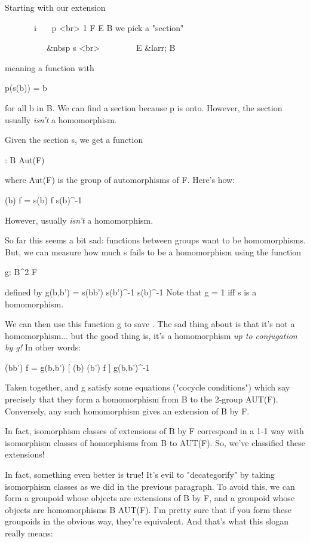 Starting with our extension

\  \  \  \  \  \  \  
 i    
\  \  \  
 p  <br>
1 \to  F \to  E \to  B 
we pick a "section"

\  \  \  \  \  \  \  
\  \  \  &nbsp
                s  <br>
\  \  \  \  \  \  \  \  
            E &larr; B

meaning a function with 

p(s(b)) = b

for all b in B.  We can find a section because p is onto.  However,
the section usually \emph{isn't} a homomorphism.

Given the section s, we get a function 

\alpha : B \to  Aut(F)

where Aut(F) is the group of automorphisms of F.  Here's how:

\alpha (b) f = s(b) f s(b)^{-1}

However, usually \alpha  \emph{isn't} a homomorphism.  

So far this seems a bit sad: functions between groups want
to be homomorphisms.
But, we can measure how much s fails to be a homomorphism 
using the function

g: B^{2} \to  F

defined by
g(b,b') = s(bb') s(b')^{-1} s(b)^{-1}
Note that g = 1 iff s is a homomorphism.  

We can then use this
function g to save \alpha .  The sad thing about \alpha  is that
it's not a homomorphism... but the good thing is, it's a homomorphism
\emph{up to conjugation by g!}  In other words:

\alpha (bb') f = g(b,b') [ \alpha (b) \alpha (b') f ] g(b,b')^{-1}

Taken together, \alpha  and g satisfy some equations ("cocycle
conditions") which say precisely that they form
a homomorphism from B to the 2-group AUT(F).  Conversely, 
any such homomorphism gives an extension of B by F.  

In fact, isomorphism classes of extensions of B by F correspond
in a 1-1 way with isomorphism classes of homorphisms from B to AUT(F).
So, we've classified these extensions!
 
In fact, something even better is true!  
It's evil to "decategorify" by 
taking isomorphism classes as we did in the previous paragraph.  To avoid 
this, we can form a groupoid whose objects are extensions of B by F, and a 
groupoid whose objects are homomorphisms B \to  AUT(F).  I'm pretty sure
that if you form these groupoids in the obvious way, they're equivalent.  
And that's what this slogan really means:

